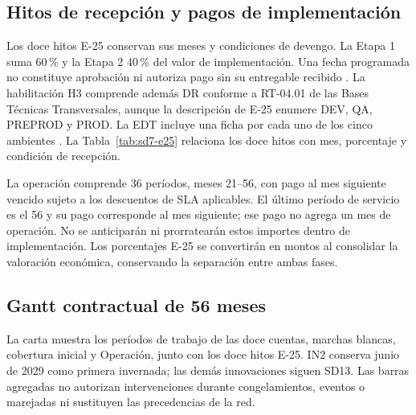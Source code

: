 \subsection{Hitos de recepción y pagos de implementación}
Los doce hitos E-25 conservan sus meses y condiciones de devengo. La Etapa 1 suma 60\,\% y la Etapa 2 40\,\% del valor de implementación. Una fecha programada no constituye aprobación ni autoriza pago sin su entregable recibido \parencite[Formulario~E-25; p.~74]{bases-admin}.
La habilitación H3 comprende además DR conforme a RT-04.01 de las Bases Técnicas Transversales, aunque la descripción de E-25 enumere DEV, QA, PREPROD y PROD. La EDT incluye una ficha por cada uno de los cinco ambientes \parencite[RT-04.01; pp.~10--11]{bases-transversales}.
La Tabla~\ref{tab:sd7-e25} relaciona los doce hitos con mes, porcentaje y condición de recepción.


La operación comprende 36 períodos, meses 21--56, con pago al mes siguiente vencido sujeto a los descuentos de SLA aplicables. El último período de servicio es el 56 y su pago corresponde al mes siguiente; ese pago no agrega un mes de operación. No se anticiparán ni prorratearán estos importes dentro de implementación. Los porcentajes E-25 se convertirán en montos al consolidar la valoración económica, conservando la separación entre ambas fases.

\subsection{Gantt contractual de 56 meses}
La carta muestra los períodos de trabajo de las doce cuentas, marchas blancas, cobertura inicial y Operación, junto con los doce hitos E-25. IN2 conserva junio de 2029 como primera invernada; las demás innovaciones siguen SD13. Las barras agregadas no autorizan intervenciones durante congelamientos, eventos o marejadas ni sustituyen las precedencias de la red.~\parencite[art.~17, pp.~12--13; Formulario E-25, p.~74]{bases-admin}


